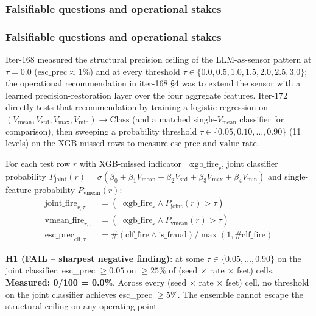 \documentclass{article}
\begin{document}
\clearpage 

\subsubsection{Falsifiable questions and operational stakes}\label{sec:p8-iter172-ensemble}

\subsubsection{Falsifiable questions and operational stakes}
Iter-168 measured the structural precision ceiling of the LLM-as-sensor
pattern at $\tau = 0.0$ ($\text{esc\_prec} \approx 1\%$) and at every
threshold $\tau \in \{0.0, 0.5, 1.0, 1.5, 2.0, 2.5, 3.0\}$; the
operational recommendation in iter-168 \S4 was to extend the sensor with
a learned precision-restoration layer over the four aggregate
features. Iter-172 directly tests that recommendation by training a
logistic regression on $(V_\mathrm{mean}, V_\mathrm{std}, V_\mathrm{max},
V_\mathrm{min}) \to \text{Class}$ (and a matched single-$V_\mathrm{mean}$
classifier for comparison), then sweeping a probability threshold
$\tau \in \{0.05, 0.10, \dots, 0.90\}$ (11 levels) on the XGB-missed
rows to measure $\text{esc\_prec}$ and $\text{value\_rate}$.

For each test row $r$ with XGB-missed indicator
$\neg \text{xgb\_fire}_r$, joint classifier probability
$P_\mathrm{joint}(r) = \sigma(\beta_0 + \beta_1 V_\mathrm{mean} +
\beta_2 V_\mathrm{std} + \beta_3 V_\mathrm{max} + \beta_4 V_\mathrm{min})$
and single-feature probability $P_\mathrm{vmean}(r)$:
\begin{align*}
\text{joint\_fire}_{r,\tau} &= (\neg \text{xgb\_fire}_r \wedge P_\mathrm{joint}(r) > \tau) \\
\text{vmean\_fire}_{r,\tau} &= (\neg \text{xgb\_fire}_r \wedge P_\mathrm{vmean}(r) > \tau) \\
\text{esc\_prec}_{\text{clf},\tau} &= \#(\text{clf\_fire} \wedge \text{is\_fraud}) /
   \max(1, \#\text{clf\_fire})
\end{align*}

\textbf{H1 (FAIL -- sharpest negative finding)}: at some
$\tau \in \{0.05, \dots, 0.90\}$ on the joint classifier, esc\_prec
$\geq 0.05$ on $\geq 25\%$ of (seed $\times$ rate $\times$ fset) cells.
\textbf{Measured: 0/100 = 0.0\%}. Across every (seed $\times$ rate
$\times$ fset) cell, no threshold on the joint classifier achieves
esc\_prec $\geq 5\%$. The ensemble cannot escape the structural
ceiling on any operating point.
\end{document}
